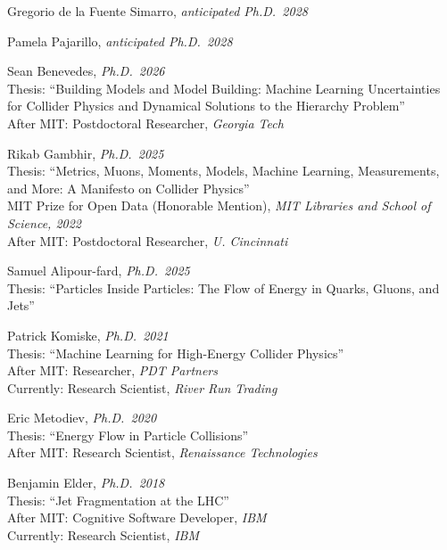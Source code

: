 \bbl

\item Gregorio de la Fuente Simarro, \emph{anticipated Ph.D.~2028}

\item Pamela Pajarillo, \emph{anticipated Ph.D.~2028}

\item Sean Benevedes, \emph{Ph.D.~2026}
\\ Thesis: ``Building Models and Model Building: Machine Learning Uncertainties for Collider Physics and Dynamical Solutions to the Hierarchy Problem''
\\ After MIT: Postdoctoral Researcher, \emph{Georgia Tech}

\item Rikab Gambhir, \emph{Ph.D.~2025}
\\ Thesis: ``Metrics, Muons, Moments, Models, Machine Learning, Measurements, and More: A Manifesto on Collider Physics''
\\ MIT Prize for Open Data (Honorable Mention), \emph{MIT Libraries and School of Science, 2022}
\\ After MIT: Postdoctoral Researcher, \emph{U. Cincinnati}

\item Samuel Alipour-fard, \emph{Ph.D.~2025}
\\ Thesis: ``Particles Inside Particles: The Flow of Energy in Quarks, Gluons, and Jets''

\item Patrick Komiske, \emph{Ph.D.~2021}
\\ Thesis: ``Machine Learning for High-Energy Collider Physics''
\\ After MIT: Researcher, \emph{PDT Partners}
\\ Currently: Research Scientist, \emph{River Run Trading}

\item Eric Metodiev, \emph{Ph.D.~2020}
\\ Thesis: ``Energy Flow in Particle Collisions''
\\ After MIT: Research Scientist, \emph{Renaissance Technologies}

\item Benjamin Elder, \emph{Ph.D.~2018}
\\ Thesis: ``Jet Fragmentation at the LHC''
\\ After MIT: Cognitive Software Developer, \emph{IBM}
\\ Currently: Research Scientist, \emph{IBM}

